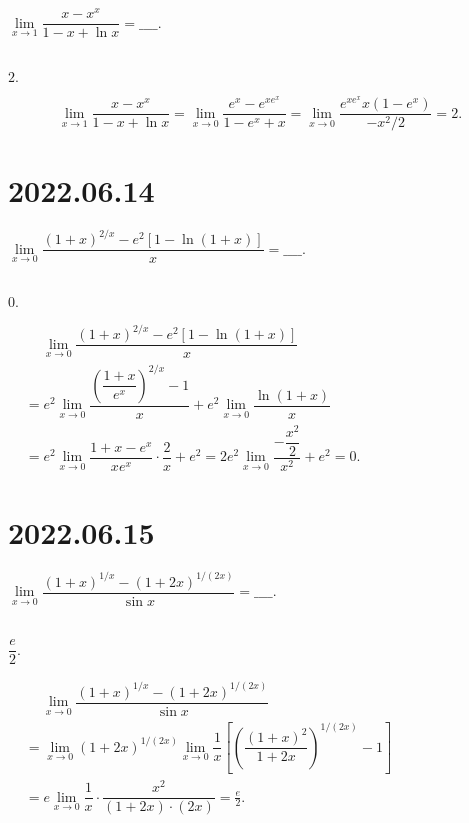 \documentclass[lang=cn,12pt]{elegantbook}
\begin{document}
$\lim\limits_{x \to 1} \dfrac{x - x^x}{1 - x + \ln x} = \_\_\_\_.$
\\ \\

\begin{solution}
  $2.$

  $$\lim\limits_{x \to 1} \dfrac{x - x^x}{1 - x + \ln x}
  = \lim\limits_{x \to 0} \dfrac{e^x - e^{x e^x}}{1 - e^x + x}
  = \lim\limits_{x \to 0} \dfrac{e^{x e^x}x(1 - e^x)}{-x^2/2}
  = 2.
  $$

\end{solution}


\section*{2022.06.14}

$\lim\limits_{x \to 0} \dfrac{\left(1+x\right)^{2/x} - e^2\left[1-\ln(1+x)\right]}{x} = \_\_\_\_.$
\\ \\

\begin{solution}
  $0.$

  $\begin{aligned}
  & \quad\ \lim\limits_{x \to 0} \dfrac{\left(1+x\right)^{2/x} - e^2\left[1-\ln(1+x)\right]}{x} \\
  &= e^2 \lim\limits_{x \to 0} \dfrac{\left(\dfrac{1+x}{e^x}\right)^{2/x} - 1}{x} + e^2\lim\limits_{x \to 0} \dfrac{\ln(1+x)}{x}\\
  &= e^2 \lim\limits_{x \to 0} \dfrac{1+x-e^x}{xe^x} \cdot \dfrac{2}{x} + e^2
  = 2e^2 \lim\limits_{x \to 0} \dfrac{-\dfrac{x^2}{2}}{x^2} + e^2 = 0.
  \end{aligned}
  $

\end{solution}


\section*{2022.06.15}

$\lim\limits_{x \to 0} \dfrac{\left(1+x\right)^{1/x} - \left(1+2x\right)^{1/(2x)} }{\sin x} = \_\_\_\_.$
\\ \\

\begin{solution}
  $\dfrac{e}{2}.$

  $\begin{aligned}
  & \quad\ \lim\limits_{x \to 0} \dfrac{\left(1+x\right)^{1/x} - \left(1+2x\right)^{1/(2x)} }{\sin x} \\
  &= \lim\limits_{x \to 0} \left(1+2x\right)^{1/(2x)} 
    \lim\limits_{x \to 0} \dfrac{1}{x} \left[\left(\dfrac{(1+x)^2}{1+2x}\right)^{1/(2x)} - 1\right]\\
  &= e \lim\limits_{x \to 0} \dfrac{1}{x}\cdot \dfrac{x^2}{(1+2x)\cdot(2x)}=\frac{e}{2}.
  \end{aligned}
  $

\end{solution}
\end{document}
